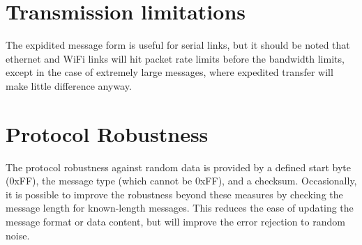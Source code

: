\section{Transmission limitations}

The expidited message form is useful for serial links, but it should be noted that ethernet and WiFi links will hit packet rate limits before the bandwidth limits, except in the case of extremely large messages, where expedited transfer will make little difference anyway.

\section{Protocol Robustness}

The protocol robustness against random data is provided by a defined start byte (0xFF), the message type (which cannot be 0xFF), and a checksum. Occasionally, it is possible to improve the robustness beyond these measures by checking the message length for known-length messages. This reduces the ease of updating the message format or data content, but will improve the error rejection to random noise.
